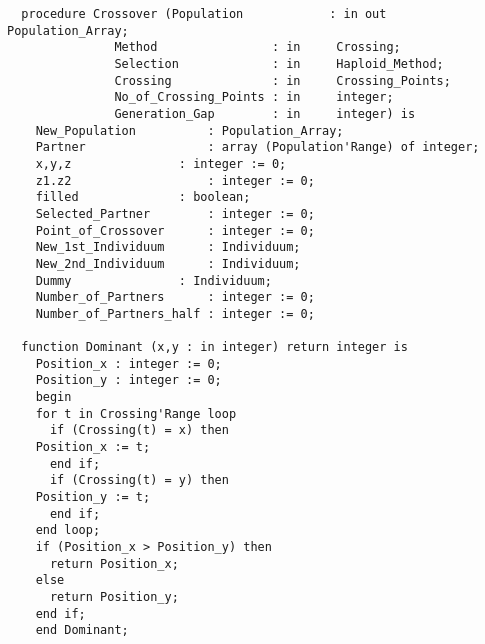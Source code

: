 \begin{verbatim}
  procedure Crossover (Population            : in out Population_Array;
		       Method	             : in     Crossing;
		       Selection             : in     Haploid_Method;
		       Crossing              : in     Crossing_Points;
		       No_of_Crossing_Points : in     integer;
		       Generation_Gap        : in     integer) is
    New_Population          : Population_Array;
    Partner                 : array (Population'Range) of integer;
    x,y,z	            : integer := 0;
    z1.z2                   : integer := 0;
    filled	            : boolean;
    Selected_Partner        : integer := 0;
    Point_of_Crossover      : integer := 0;
    New_1st_Individuum      : Individuum;
    New_2nd_Individuum      : Individuum;
    Dummy	            : Individuum;
    Number_of_Partners      : integer := 0;
    Number_of_Partners_half : integer := 0;

  function Dominant (x,y : in integer) return integer is
    Position_x : integer := 0;
    Position_y : integer := 0;
    begin
    for t in Crossing'Range loop
      if (Crossing(t) = x) then
	Position_x := t;
      end if;
      if (Crossing(t) = y) then
	Position_y := t;
      end if;
    end loop;
    if (Position_x > Position_y) then
      return Position_x;
    else
      return Position_y;
    end if;
    end Dominant;


\end{verbatim}
